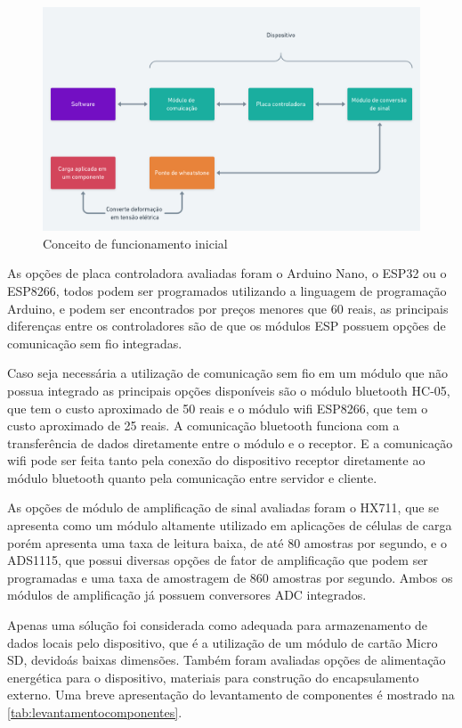 \begin{figure}[H]
	\caption{\label{fig:2035} Conceito de funcionamento inicial}
	\begin{center}
		\includegraphics[width=\textwidth]{pictures/2035.png}
	\end{center}
\end{figure}

As opções de placa controladora avaliadas foram o Arduino Nano, o ESP32 ou o ESP8266, todos podem ser programados utilizando a linguagem de programação Arduino, e podem ser
encontrados por preços menores que 60 reais, as principais diferenças entre os controladores são de que os módulos ESP possuem opções de comunicação sem fio integradas.

Caso seja necessária a utilização de comunicação sem fio em um módulo que não possua integrado as principais opções disponíveis são o módulo bluetooth HC-05, que tem o custo
aproximado de 50 reais e o módulo wifi ESP8266, que tem o custo aproximado de 25 reais.
A comunicação bluetooth funciona com a transferência de dados diretamente entre o módulo e o receptor.
E a comunicação wifi pode ser feita tanto pela conexão do dispositivo receptor diretamente ao módulo bluetooth quanto pela comunicação entre servidor e cliente.

As opções de módulo de amplificação de sinal avaliadas foram o HX711, que se apresenta como um módulo altamente utilizado em aplicações de células de carga porém apresenta
uma taxa de leitura baixa, de até 80 amostras por segundo, e o ADS1115, que possui diversas opções de fator de amplificação que podem ser programadas e uma taxa de amostragem de 860 amostras
por segundo. Ambos os módulos de amplificação já possuem conversores ADC integrados.

Apenas uma sólução foi considerada como adequada para armazenamento de dados locais pelo dispositivo, que é a utilização de um módulo de cartão Micro SD, devidoás baixas dimensões.
Também foram avaliadas opções de alimentação energética para o dispositivo, materiais para construção do encapsulamento externo.
Uma breve apresentação do levantamento de componentes é mostrado na \autoref{tab:levantamentocomponentes}.

